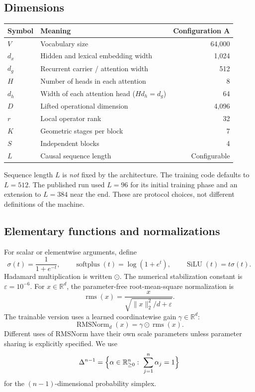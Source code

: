 \documentclass[11pt,a4paper]{article}
\newcommand{\R}{\mathbb{R}}
\newcommand{\rmsn}{\operatorname{RMSNorm}}
\newcommand{\SiLU}{\operatorname{SiLU}}
\newcommand{\softplus}{\operatorname{softplus}}
\begin{document}
\subsection{Dimensions}

\begin{center}
\begin{tabular}{p{}p{}r}
\toprule
Symbol & Meaning & Configuration A\\
\midrule
$V$ & Vocabulary size & 64{,}000\\
$d_x$ & Hidden and lexical embedding width & 1{,}024\\
$d_g$ & Recurrent carrier / attention width & 512\\
$H$ & Number of heads in each attention & 8\\
$d_h$ & Width of each attention head ($Hd_h=d_g$) & 64\\
$D$ & Lifted operational dimension & 4{,}096\\
$r$ & Local operator rank & 32\\
$K$ & Geometric stages per block & 7\\
$S$ & Independent blocks & 4\\
$L$ & Causal sequence length & Configurable\\
\bottomrule
\end{tabular}
\end{center}

Sequence length $L$ is \emph{not} fixed by the architecture. The training code defaults to $L=512$. The published run used $L=96$ for its initial training phase and an extension to $L=384$ near the end. These are protocol choices, not different definitions of the
machine.

\subsection{Elementary functions and normalizations}

For scalar or elementwise arguments, define
\begin{equation}
\sigma(t)=\frac{1}{1+e^{-t}},\qquad \softplus(t)=\log(1+e^{t}),\qquad \SiLU(t)=t\sigma(t).
\end{equation}
Hadamard multiplication is written $\odot$. The numerical stabilization constant is $\varepsilon=10^{-6}$.
For $x\in\R^d$, the parameter-free root-mean-square normalization is
\begin{equation}
\operatorname{rms}(x)=\frac{x}{\sqrt{\|x\|_2^2/d+\varepsilon}}.
\end{equation}
The trainable version uses a learned coordinatewise gain $\gamma\in\R^d$:
\begin{equation}
\rmsn_d(x)=\gamma\odot\operatorname{rms}(x).
\end{equation}
Different uses of RMSNorm have their own scale parameters unless parameter sharing is explicitly
specified. We use
\begin{equation}
\Delta^{n-1}=\Bigl\{\alpha\in\R^n_{\ge 0}:\ \sum_{j=1}^{n}\alpha_j=1\Bigr\}
\end{equation}
for the $(n-1)$-dimensional probability simplex.
\end{document}
